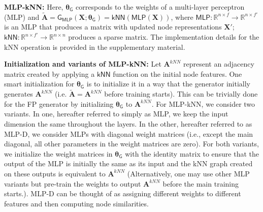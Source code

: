 \documentclass{article}
\def\mA{{\bm{A}}}
\def\mX{{\bm{X}}}
\newcommand{\func}[1]{\ensuremath{\mathsf{#1}}}
\begin{document}
\textbf{MLP-kNN:} Here, $\bm{\theta}_\func{G}$ corresponds to the weights of a multi-layer perceptron (MLP) and $\tilde{\mA}=\func{G_{MLP}}(\mX; \bm{\theta}_\func{G})=\func{kNN}(\func{MLP}(\mX))$, where $\func{MLP}:\mathbb{R}^{n\times f}\rightarrow \mathbb{R}^{n\times f'}$ is an MLP that produces a matrix with updated node representations $\mX'$; $\func{kNN}:\mathbb{R}^{n\times f'}\rightarrow \mathbb{R}^{n\times n}$ produces a sparse matrix. The implementation details for the kNN operation is provided in the supplementary material. 

\textbf{Initialization and variants of MLP-kNN:}
Let $\mA^{kNN}$ represent an adjacency matrix created by applying a $\func{kNN}$ function on the initial node features. One smart initialization for $\bm{\theta}_\func{G}$ is to initialize it in a way that the generator initially generates $\mA^{kNN}$ (i.e. $\tilde{\mA}=\mA^{kNN}$ before training starts). This can be trivially done for the FP generator by initializing $\bm{\theta}_\func{G}$ to $\mA^{kNN}$. 
For MLP-kNN, we consider two variants. In one, hereafter referred to simply as MLP, we keep the input dimension the same throughout the layers. In the other, hereafter referred to as MLP-D, we consider MLPs with diagonal weight matrices (i.e., except the main diagonal, all other parameters in the weight matrices are zero). For both variants, we initialize the weight matrices in $\bm{\theta}_\func{G}$ with the identity matrix to ensure that the output of the MLP is initially the same as its input and the kNN graph created on these outputs is equivalent to $\mA^{kNN}$ (Alternatively, one may use other MLP variants but pre-train the weights to output $\mA^{kNN}$ before the main training starts.). MLP-D can be thought of as assigning different weights to different features and then computing node similarities.
\end{document}
